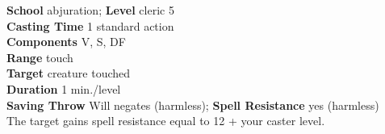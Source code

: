 \textbf{School} abjuration; \textbf{Level} cleric 5\\
\textbf{Casting Time} 1 standard action\\
\textbf{Components} V, S, DF\\
\textbf{Range} touch\\
\textbf{Target} creature touched\\
\textbf{Duration} 1 min./level\\
\textbf{Saving Throw }Will negates (harmless); \textbf{Spell Resistance} yes (harmless)\\
The target gains spell resistance equal to 12 + your caster level.\\
